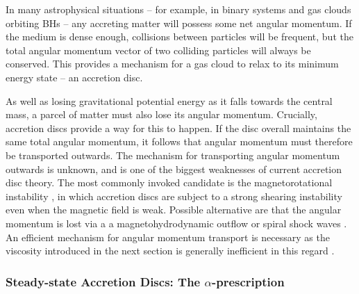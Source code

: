 In many astrophysical situations -- for example, 
in binary systems and gas clouds orbiting BHs --
any accreting matter will possess some net angular momentum.
If the medium is dense enough, collisions between particles will be
frequent, but the total angular momentum vector of two colliding particles
will always be conserved. This provides a mechanism for a gas cloud to relax to 
its minimum energy state -- an accretion disc. 

As well as losing gravitational potential energy as it falls towards 
the central mass, a parcel of matter must also lose its angular momentum. 
Crucially, accretion discs provide a way for this to happen. 
If the disc overall maintains the same total 
angular momentum, it follows that angular momentum must 
therefore be transported outwards. The mechanism for transporting 
angular momentum outwards is unknown, and is one of the biggest 
weaknesses of current accretion disc theory. The most commonly invoked
candidate is the magnetorotational instability \citep[MRI; ][]{balbus1991},
in which accretion discs are subject to a strong shearing instability even
when the magnetic field is weak. Possible alternative are
that the angular momentum is lost
via a a magnetohydrodynamic outflow \citep{blandfordpayne} or spiral shock waves
\citep{ju2016}. An efficient mechanism
for angular momentum transport is necessary as the 
viscosity introduced in the next section is
generally inefficient in this regard \citep{pringle1991}.





\subsubsection{Steady-state Accretion Discs: The $\alpha$-prescription}

\label{sec:alpha_disc}


